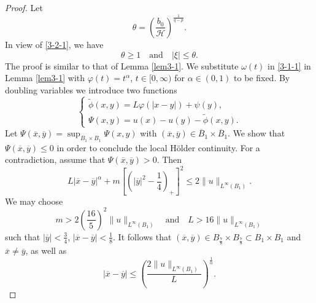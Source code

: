 \documentclass[11pt,reqno]{amsart}
\numberwithin{equation}{section}
\begin{document}
\begin{proof}
Let
$$
\theta=\left(\frac{b_0}{\mathcal{H}}\right)^\frac{1}{q-p}.
$$
In view of \eqref{3-2-1}, we have
\begin{equation}
\label{3-2-2}
\theta\ge1 \quad\text{and}\quad |\xi|\le \theta.
\end{equation}
The proof is similar to that of Lemma \ref{lem3-1}. We substitute $\omega(t)$ in \eqref{3-1-1} in Lemma \ref{lem3-1} with
$\varphi(t)=t^\alpha$,  $t\in[0,\infty)$ for $\alpha\in(0,1)$ to be fixed. By doubling variables we introduce two functions
\begin{equation*}
\begin{cases}
\widetilde{\phi}(x,y)=L\varphi(|x-y|)+\psi(y),\\
\Psi(x,y)=u(x)-u(y)-\widetilde{\phi}(x,y).
\end{cases}
\end{equation*}
Let $\Psi(\overline{x},\overline{y})=\sup_{B_1\times B_1}\Psi(x,y)$ with $(\overline{x},\overline{y})\in \overline{B}_1\times\overline{B}_1$. We show that$\Psi(\overline{x},\overline{y})\le0$
in order to conclude the local H\"{o}lder continuity.
For a contradiction, assume that $\Psi(\overline{x},\overline{y})>0$.
Then
$$
L|\overline{x}-\overline{y}|^\alpha+m\left[\left(|\overline{y}|^2-\frac{1}{4}\right)_+\right]^2\le2\|u\|_{L^\infty(B_1)}.
$$
We may choose
$$
m>2\left(\frac{16}{5}\right)^2\|u\|_{L^\infty(B_1)}
\quad\text{and}\quad
L>16\|u\|_{L^\infty(B_1)}
$$
such that $|\overline{y}|<\frac{3}{4}$, $|\overline{x}-\overline{y}|<\frac{1}{8}$.
It follows that $(\overline{x},\overline{y})\in B_\frac{7}{8}\times B_\frac{7}{8}\subset B_1\times B_1$ and $\overline{x}\neq\overline{y}$, as well as
\begin{equation}
\label{3-2-3}
|\overline{x}-\overline{y}|\le\left(\frac{2\|u\|_{L^\infty(B_1)}}{L}\right)^\frac{1}{\alpha}.
\end{equation}


\end{proof}
\end{document}
